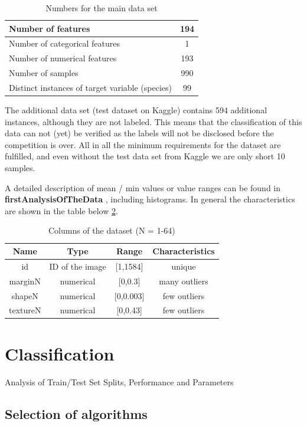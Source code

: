 \documentclass{sig-alternate-05-2015}
\begin{document}
\begin{table}[h]
\centering
\caption{Numbers for the main data set}
\label{tbl:numbers}
\begin{tabular}{|l|c|}
\hline 
Number of features & 194 \\ 
\hline 
Number of categorical features & 1 \\ 
\hline 
Number of numerical features & 193 \\ 
\hline 
Number of samples & 990  \\ 
\hline 
Distinct instances of target variable (species) & 99 \\ 
\hline 
\end{tabular}
\end{table}

The additional data set (test dataset on Kaggle) contains 594 additional instances, although they are not labeled.
This means that the classification of this data can not (yet) be verified as the labels will not be disclosed before the competition is over.
All in all the minimum requirements for the dataset are fulfilled, and even without the test data set from Kaggle we are only short 10 samples.


A detailed description of mean / min values or value ranges can be found in 
\textbf{firstAnalysisOfTheData}
, including histograms.
In general the characteristics are shown in the table below \ref{tbl:columns}.

\begin{table}[h]
\centering
\caption{Columns of the dataset (N = 1-64)}
\label{tbl:columns}
\begin{tabular}{|c|c|c|c|}
\hline 
Name & Type & Range & Characteristics \\ 
\hline 
id & ID of the image & [1,1584] & unique \\ 
\hline 
marginN & numerical & [0,0.3] & many outliers \\ 
\hline 
shapeN & numerical & [0,0.003] & few outliers \\ 
\hline 
textureN & numerical & [0,0.43] & few outliers \\ 
\hline 
\end{tabular} 
\end{table}

\section{Classification}
Analysis of Train/Test Set Splits, Performance and Parameters

\subsection{Selection of algorithms}
\end{document}
